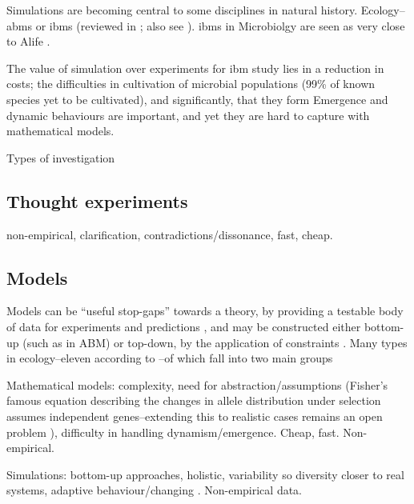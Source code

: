 Simulations are becoming central to some disciplines in natural history.
Ecology--\glspl{abm} or \glspl{ibm} (reviewed in
\autocite{DeAngelis2005}; also see
\autocite{Grimm:2006fk,Grimm:2005wd,Grimm:1999kf,Hogeweg:1990jz}).
\glspl{ibm} in Microbiolgy are seen as very close to Alife \autocite{Grimm:2009th}.

The value of simulation over experiments for
\gls{ibm} study lies in a reduction in costs; the difficulties in
cultivation of microbial populations (99\% of known species yet to be
cultivated), and significantly, that they form  Emergence and
dynamic behaviours are important, and yet they are hard to capture with
mathematical models.

Types of investigation

\subsection{Thought experiments}\label{thought-experiments}

non-empirical, clarification, contradictions/dissonance, fast, cheap.

\subsection{Models}\label{models}


Models can be ``useful stop-gaps'' towards a theory, by providing a
testable body of data for experiments and predictions
\autocite{Krakauer2011}, and may be constructed either bottom-up (such
as in ABM) or top-down, by the application of constraints
\autocite{Krakauer2011}. Many types in \eg ecology--eleven according to
\autocite{Jorgensen2008}--of which fall into two main groups

Mathematical models: complexity, need for abstraction/assumptions
(\eg Fisher's famous equation describing the changes in allele
distribution under selection assumes independent genes--extending this
to realistic cases remains an open problem \autocite{Schuster2011}),
difficulty in handling dynamism/emergence. Cheap, fast. Non-empirical.

Simulations: bottom-up approaches, holistic, variability so diversity
closer to real systems, adaptive behaviour/changing
\autocite{Ferrer:2008hv}. Non-empirical data.

